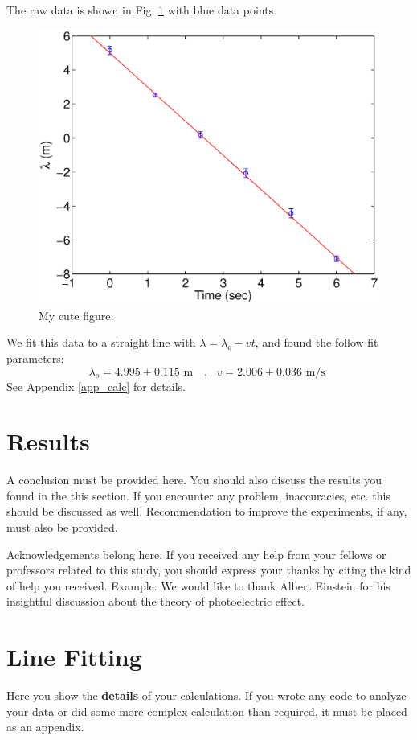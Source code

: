 \documentclass[aps,nofootinbib,onecolumn,groupedaddress,a4paper]{revtex4}
\begin{document}
The raw data is shown in Fig. \ref{rawplot} with blue data points.
\begin{figure}[h]
\caption{My cute figure.\label{rawplot}}
\includegraphics[width=0.5\columnwidth]{sample_plot.eps}
\end{figure}
We fit this data to a straight line with $\lambda = \lambda_o - v t$, and found the follow fit parameters:
\[
\lambda_o = 4.995 \pm 0.115 \mbox{ m } \,\,\,\, , \,\,\,\, v = 2.006 \pm 0.036 \mbox{ m/s }
\]
See Appendix \ref{app_calc} for details.

\section{Results}
A conclusion must be provided here. You should also discuss the results you found in the this section. If you encounter any problem, inaccuracies, etc. this should be discussed as well. Recommendation to improve the experiments, if any, must also be provided.


\begin{acknowledgements}
Acknowledgements belong here. If you received any help from your fellows or professors related to this study, you should express your thanks by citing the kind of help you received. Example: We would like to thank Albert Einstein for his insightful discussion about the theory of photoelectric effect.
\end{acknowledgements}

\appendix
\section{Line Fitting \label{app_calc}}
Here you show the {\bf details} of your calculations. If you wrote any code to analyze your data or did some more complex calculation than required, it must be placed as an appendix.
\end{document}
